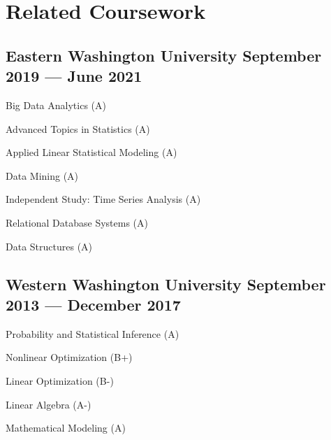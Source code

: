 \documentclass[letter,10pt]{article}
\begin{document}
\section{Related Coursework}
\subsection{{Eastern Washington University \hfill September 2019 --- June 2021}}
\begin{zitemize}
    \item Big Data Analytics (A)
    \item Advanced Topics in Statistics (A)
    \item Applied Linear Statistical Modeling (A)
    \item Data Mining (A)
    \item Independent Study: Time Series Analysis (A)
    \item Relational Database Systems (A)
    \item Data Structures (A)
\end{zitemize}

\subsection{{Western Washington University \hfill September 2013 --- December 2017}}
\begin{zitemize}
    \item Probability and Statistical Inference (A)
    \item Nonlinear Optimization (B+)
    \item Linear Optimization (B-)
    \item Linear Algebra (A-)
    \item Mathematical Modeling (A)
\end{zitemize}
\end{document}
